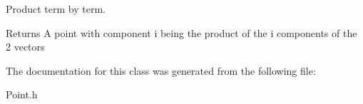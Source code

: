 \-Product term by term. 

\begin{DoxyReturn}{\-Returns}
\-A point with component i being the product of the i components of the 2 vectors 
\end{DoxyReturn}


\-The documentation for this class was generated from the following file\-:\begin{DoxyCompactItemize}
\item 
\-Point.\-h\end{DoxyCompactItemize}
